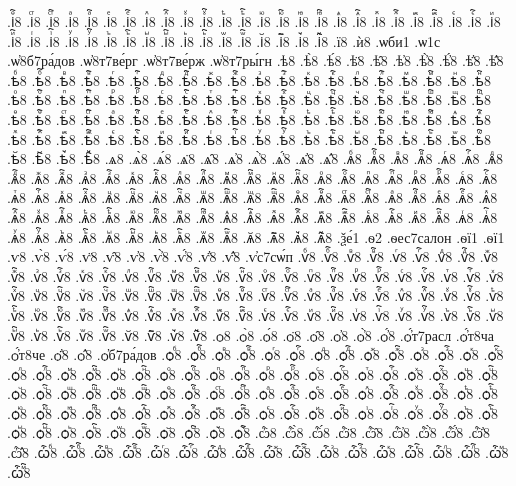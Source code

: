 {.іⷴ҇8
.іⷵ8
.іⷵ҇8
.іⷶ8
.іⷶ҇8
.іⷷ8
.іⷷ҇8
.іⷸ8
.іⷸ҇8
.іⷹ8
.іⷹ҇8
.іⷺ8
.іⷺ҇8
.іⷻ8
.іⷻ҇8
.іⷼ8
.іⷼ҇8
.іⷽ8
.іⷽ҇8
.іⷾ8
.іⷾ҇8
.іⷿ8
.іⷿ҇8
.іꙴ8
.іꙴ҇8
.іꙵ8
.іꙵ҇8
.іꙶ8
.іꙶ҇8
.іꙷ8
.іꙷ҇8
.іꙸ8
.іꙸ҇8
.іꙹ8
.іꙹ҇8
.іꙺ8
.іꙺ҇8
.іꙻ8
.іꙻ҇8
.і꙼8
.і꙼҇8
.і꙽8
.і꙽҇8
.ї8
.ѝ8
.ѡби1
.ѡ1с
.ѡ҆8б7ра́дов
.ѡ҆8т7ве́рг
.ѡ҆8т7ве́рж
.ѡ҆8т7ры́гн
.ѣ8
.ѣ̀8
.ѣ́8
.ѣ̈8
.ѣ̑8
.ѣ҆8
.ѣ҆̀8
.ѣ҆́8
.ѣ҆̈8
.ѣ҆̑8
.ѣⷠ8
.ѣⷠ҇8
.ѣⷡ8
.ѣⷡ҇8
.ѣⷢ8
.ѣⷢ҇8
.ѣⷣ8
.ѣⷣ҇8
.ѣⷤ8
.ѣⷤ҇8
.ѣⷥ8
.ѣⷥ҇8
.ѣⷦ8
.ѣⷦ҇8
.ѣⷧ8
.ѣⷧ҇8
.ѣⷨ8
.ѣⷨ҇8
.ѣⷩ8
.ѣⷩ҇8
.ѣⷪ8
.ѣⷪ҇8
.ѣⷫ8
.ѣⷫ҇8
.ѣⷬ8
.ѣⷬ҇8
.ѣⷭ8
.ѣⷭ҇8
.ѣⷮ8
.ѣⷮ҇8
.ѣⷯ8
.ѣⷯ҇8
.ѣⷰ8
.ѣⷰ҇8
.ѣⷱ8
.ѣⷱ҇8
.ѣⷲ8
.ѣⷲ҇8
.ѣⷳ8
.ѣⷳ҇8
.ѣⷴ8
.ѣⷴ҇8
.ѣⷵ8
.ѣⷵ҇8
.ѣⷶ8
.ѣⷶ҇8
.ѣⷷ8
.ѣⷷ҇8
.ѣⷸ8
.ѣⷸ҇8
.ѣⷹ8
.ѣⷹ҇8
.ѣⷺ8
.ѣⷺ҇8
.ѣⷻ8
.ѣⷻ҇8
.ѣⷼ8
.ѣⷼ҇8
.ѣⷽ8
.ѣⷽ҇8
.ѣⷾ8
.ѣⷾ҇8
.ѣⷿ8
.ѣⷿ҇8
.ѣꙴ8
.ѣꙴ҇8
.ѣꙵ8
.ѣꙵ҇8
.ѣꙶ8
.ѣꙶ҇8
.ѣꙷ8
.ѣꙷ҇8
.ѣꙸ8
.ѣꙸ҇8
.ѣꙹ8
.ѣꙹ҇8
.ѣꙺ8
.ѣꙺ҇8
.ѣꙻ8
.ѣꙻ҇8
.ѣ꙼8
.ѣ꙼҇8
.ѣ꙽8
.ѣ꙽҇8
.ѧ8
.ѧ̀8
.ѧ́8
.ѧ̈8
.ѧ̑8
.ѧ҆8
.ѧ҆̀8
.ѧ҆́8
.ѧ҆̈8
.ѧ҆̑8
.ѧⷠ8
.ѧⷠ҇8
.ѧⷡ8
.ѧⷡ҇8
.ѧⷢ8
.ѧⷢ҇8
.ѧⷣ8
.ѧⷣ҇8
.ѧⷤ8
.ѧⷤ҇8
.ѧⷥ8
.ѧⷥ҇8
.ѧⷦ8
.ѧⷦ҇8
.ѧⷧ8
.ѧⷧ҇8
.ѧⷨ8
.ѧⷨ҇8
.ѧⷩ8
.ѧⷩ҇8
.ѧⷪ8
.ѧⷪ҇8
.ѧⷫ8
.ѧⷫ҇8
.ѧⷬ8
.ѧⷬ҇8
.ѧⷭ8
.ѧⷭ҇8
.ѧⷮ8
.ѧⷮ҇8
.ѧⷯ8
.ѧⷯ҇8
.ѧⷰ8
.ѧⷰ҇8
.ѧⷱ8
.ѧⷱ҇8
.ѧⷲ8
.ѧⷲ҇8
.ѧⷳ8
.ѧⷳ҇8
.ѧⷴ8
.ѧⷴ҇8
.ѧⷵ8
.ѧⷵ҇8
.ѧⷶ8
.ѧⷶ҇8
.ѧⷷ8
.ѧⷷ҇8
.ѧⷸ8
.ѧⷸ҇8
.ѧⷹ8
.ѧⷹ҇8
.ѧⷺ8
.ѧⷺ҇8
.ѧⷻ8
.ѧⷻ҇8
.ѧⷼ8
.ѧⷼ҇8
.ѧⷽ8
.ѧⷽ҇8
.ѧⷾ8
.ѧⷾ҇8
.ѧⷿ8
.ѧⷿ҇8
.ѧꙴ8
.ѧꙴ҇8
.ѧꙵ8
.ѧꙵ҇8
.ѧꙶ8
.ѧꙶ҇8
.ѧꙷ8
.ѧꙷ҇8
.ѧꙸ8
.ѧꙸ҇8
.ѧꙹ8
.ѧꙹ҇8
.ѧꙺ8
.ѧꙺ҇8
.ѧꙻ8
.ѧꙻ҇8
.ѧ꙼8
.ѧ꙼҇8
.ѧ꙽8
.ѧ꙽҇8
.ѯе́1
.ѳ2
.ѳес7салон
.ѳї1
.ѳї1
.ѵ8
.ѵ̀8
.ѵ́8
.ѵ̈8
.ѵ̑8
.ѵ҆8
.ѵ҆̀8
.ѵ҆́8
.ѵ҆̈8
.ѵ҆̑8
.ѵ҆с7сѡ́п
.ѵⷠ8
.ѵⷠ҇8
.ѵⷡ8
.ѵⷡ҇8
.ѵⷢ8
.ѵⷢ҇8
.ѵⷣ8
.ѵⷣ҇8
.ѵⷤ8
.ѵⷤ҇8
.ѵⷥ8
.ѵⷥ҇8
.ѵⷦ8
.ѵⷦ҇8
.ѵⷧ8
.ѵⷧ҇8
.ѵⷨ8
.ѵⷨ҇8
.ѵⷩ8
.ѵⷩ҇8
.ѵⷪ8
.ѵⷪ҇8
.ѵⷫ8
.ѵⷫ҇8
.ѵⷬ8
.ѵⷬ҇8
.ѵⷭ8
.ѵⷭ҇8
.ѵⷮ8
.ѵⷮ҇8
.ѵⷯ8
.ѵⷯ҇8
.ѵⷰ8
.ѵⷰ҇8
.ѵⷱ8
.ѵⷱ҇8
.ѵⷲ8
.ѵⷲ҇8
.ѵⷳ8
.ѵⷳ҇8
.ѵⷴ8
.ѵⷴ҇8
.ѵⷵ8
.ѵⷵ҇8
.ѵⷶ8
.ѵⷶ҇8
.ѵⷷ8
.ѵⷷ҇8
.ѵⷸ8
.ѵⷸ҇8
.ѵⷹ8
.ѵⷹ҇8
.ѵⷺ8
.ѵⷺ҇8
.ѵⷻ8
.ѵⷻ҇8
.ѵⷼ8
.ѵⷼ҇8
.ѵⷽ8
.ѵⷽ҇8
.ѵⷾ8
.ѵⷾ҇8
.ѵⷿ8
.ѵⷿ҇8
.ѵꙴ8
.ѵꙴ҇8
.ѵꙵ8
.ѵꙵ҇8
.ѵꙶ8
.ѵꙶ҇8
.ѵꙷ8
.ѵꙷ҇8
.ѵꙸ8
.ѵꙸ҇8
.ѵꙹ8
.ѵꙹ҇8
.ѵꙺ8
.ѵꙺ҇8
.ѵꙻ8
.ѵꙻ҇8
.ѵ꙼8
.ѵ꙼҇8
.ѵ꙽8
.ѵ꙽҇8
.ѻ8
.ѻ̀8
.ѻ́8
.ѻ̈8
.ѻ̑8
.ѻ҆8
.ѻ҆̀8
.ѻ҆́8
.ѻ҆́т7расл
.ѻ҆́т8ча
.ѻ҆́т8че
.ѻ҆̈8
.ѻ҆̑8
.ѻ҆б7ра́дов
.ѻⷠ8
.ѻⷠ҇8
.ѻⷡ8
.ѻⷡ҇8
.ѻⷢ8
.ѻⷢ҇8
.ѻⷣ8
.ѻⷣ҇8
.ѻⷤ8
.ѻⷤ҇8
.ѻⷥ8
.ѻⷥ҇8
.ѻⷦ8
.ѻⷦ҇8
.ѻⷧ8
.ѻⷧ҇8
.ѻⷨ8
.ѻⷨ҇8
.ѻⷩ8
.ѻⷩ҇8
.ѻⷪ8
.ѻⷪ҇8
.ѻⷫ8
.ѻⷫ҇8
.ѻⷬ8
.ѻⷬ҇8
.ѻⷭ8
.ѻⷭ҇8
.ѻⷮ8
.ѻⷮ҇8
.ѻⷯ8
.ѻⷯ҇8
.ѻⷰ8
.ѻⷰ҇8
.ѻⷱ8
.ѻⷱ҇8
.ѻⷲ8
.ѻⷲ҇8
.ѻⷳ8
.ѻⷳ҇8
.ѻⷴ8
.ѻⷴ҇8
.ѻⷵ8
.ѻⷵ҇8
.ѻⷶ8
.ѻⷶ҇8
.ѻⷷ8
.ѻⷷ҇8
.ѻⷸ8
.ѻⷸ҇8
.ѻⷹ8
.ѻⷹ҇8
.ѻⷺ8
.ѻⷺ҇8
.ѻⷻ8
.ѻⷻ҇8
.ѻⷼ8
.ѻⷼ҇8
.ѻⷽ8
.ѻⷽ҇8
.ѻⷾ8
.ѻⷾ҇8
.ѻⷿ8
.ѻⷿ҇8
.ѻꙴ8
.ѻꙴ҇8
.ѻꙵ8
.ѻꙵ҇8
.ѻꙶ8
.ѻꙶ҇8
.ѻꙷ8
.ѻꙷ҇8
.ѻꙸ8
.ѻꙸ҇8
.ѻꙹ8
.ѻꙹ҇8
.ѻꙺ8
.ѻꙺ҇8
.ѻꙻ8
.ѻꙻ҇8
.ѻ꙼8
.ѻ꙼҇8
.ѻ꙽8
.ѻ꙽҇8
.ѽ8
.ѽ̀8
.ѽ́8
.ѽ̈8
.ѽ̑8
.ѽ҆8
.ѽ҆̀8
.ѽ҆́8
.ѽ҆̈8
.ѽ҆̑8
.ѽⷠ8
.ѽⷠ҇8
.ѽⷡ8
.ѽⷡ҇8
.ѽⷢ8
.ѽⷢ҇8
.ѽⷣ8
.ѽⷣ҇8
.ѽⷤ8
.ѽⷤ҇8
.ѽⷥ8
.ѽⷥ҇8
.ѽⷦ8
.ѽⷦ҇8
.ѽⷧ8
.ѽⷧ҇8
.ѽⷨ8
.ѽⷨ҇8
}
